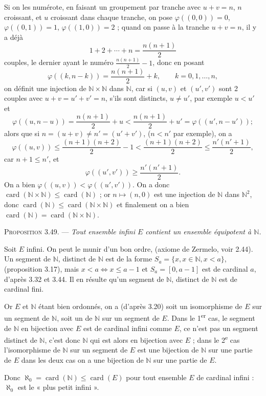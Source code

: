 Si on les numérote, en faisant un groupement par tranche avec $u+v=n$, $n$ croissant, et $u$ croissant dans chaque tranche, on pose $\varphi((0,0))=0$, $\varphi((0,1))=1$, $\varphi((1,0))=2$ ; quand on passe à la tranche $u+v=n$, il y a déjà
\[
1+2+\cdots+n=\frac{n(n+1)}2
\]
couples, le dernier ayant le numéro $\frac{n(n+1)}2-1$, donc en posant
\[
\varphi((k,n-k))=\frac{n(n+1)}2+k,\qquad k=0,1,\ldots,n,
\]
on définit une injection de $\mathbb N\times\mathbb N$ dans $\mathbb N$, car si $(u,v)$ et $(u',v')$ sont 2 couples avec $u+v=u'+v'=n$, s'ils sont distincts, $u\ne u'$, par exemple $u<u'$ et
\[
\varphi((u,n-u))=\frac{n(n+1)}2+u<\frac{n(n+1)}2+u'=\varphi((u',n-u'));
\]
alors que si $n=(u+v)\ne n'=(u'+v')$, ($n<n'$ par exemple), on a
\[
\varphi((u,v))\le\frac{(n+1)(n+2)}2-1<\frac{(n+1)(n+2)}2
\le\frac{n'(n'+1)}2,
\]
car $n+1\le n'$, et
\[
\varphi((u',v'))\ge\frac{n'(n'+1)}2.
\]
On a bien $\varphi((u,v))<\varphi((u',v'))$. On a donc $\operatorname{card}(\mathbb N\times\mathbb N)\le\operatorname{card}(\mathbb N)$ ; or $n\mapsto(n,0)$ est une injection de $\mathbb N$ dans $\mathbb N^2$, donc $\operatorname{card}(\mathbb N)\le\operatorname{card}(\mathbb N\times\mathbb N)$ et finalement on a bien $\operatorname{card}(\mathbb N)=\operatorname{card}(\mathbb N\times\mathbb N)$. \bookend

\medskip\noindent\textsc{Proposition 3.49.} --- \emph{Tout ensemble infini $E$ contient un ensemble équipotent à $\mathbb N$.}

Soit $E$ infini. On peut le munir d'un bon ordre, (axiome de Zermelo, voir 2.44). Un segment de $\mathbb N$, distinct de $\mathbb N$ est de la forme $S_a=\{x,x\in\mathbb N,x<a\}$, (proposition 3.17), mais $x<a\Leftrightarrow x\le a-1$ et $S_a=[0,a-1]$ est de cardinal $a$, d'après 3.32 et 3.44. Il en résulte qu'un segment de $\mathbb N$, distinct de $\mathbb N$ est de cardinal fini.

Or $E$ et $\mathbb N$ étant bien ordonnés, on a (d'après 3.20) soit un isomorphisme de $E$ sur un segment de $\mathbb N$, soit un de $\mathbb N$ sur un segment de $E$. Dans le 1\textsuperscript{er} cas, le segment de $\mathbb N$ en bijection avec $E$ est de cardinal infini comme $E$, ce n'est pas un segment distinct de $\mathbb N$, c'est donc $\mathbb N$ qui est alors en bijection avec $E$ ; dans le 2\textsuperscript{e} cas l'isomorphisme de $\mathbb N$ sur un segment de $E$ est une bijection de $\mathbb N$ sur une partie de $E$ dans les deux cas on a une bijection de $\mathbb N$ sur une partie de $E$.

Donc $\aleph_0=\operatorname{card}(\mathbb N)\le\operatorname{card}(E)$ pour tout ensemble $E$ de cardinal infini : $\aleph_0$ est le « plus petit infini ». \bookend

